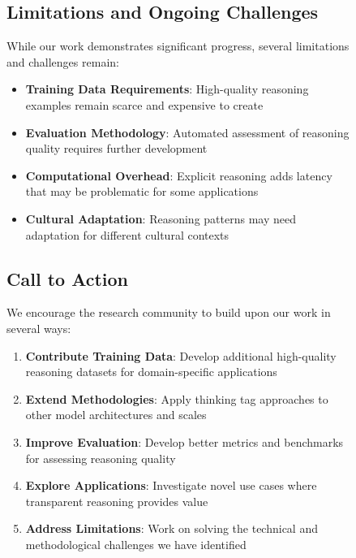 \begin{table}[H]
\begin{figure}[H]
\subsection{Limitations and Ongoing Challenges}

While our work demonstrates significant progress, several limitations and challenges remain:

\begin{itemize}
    \item \textbf{Training Data Requirements}: High-quality reasoning examples remain scarce and expensive to create
    \item \textbf{Evaluation Methodology}: Automated assessment of reasoning quality requires further development
    \item \textbf{Computational Overhead}: Explicit reasoning adds latency that may be problematic for some applications
    \item \textbf{Cultural Adaptation}: Reasoning patterns may need adaptation for different cultural contexts
\end{itemize}

\subsection{Call to Action}

We encourage the research community to build upon our work in several ways:

\begin{enumerate}
    \item \textbf{Contribute Training Data}: Develop additional high-quality reasoning datasets for domain-specific applications
    
    \item \textbf{Extend Methodologies}: Apply thinking tag approaches to other model architectures and scales
    
    \item \textbf{Improve Evaluation}: Develop better metrics and benchmarks for assessing reasoning quality
    
    \item \textbf{Explore Applications}: Investigate novel use cases where transparent reasoning provides value
    
    \item \textbf{Address Limitations}: Work on solving the technical and methodological challenges we have identified
\end{enumerate}


\end{figure}
\end{table}
